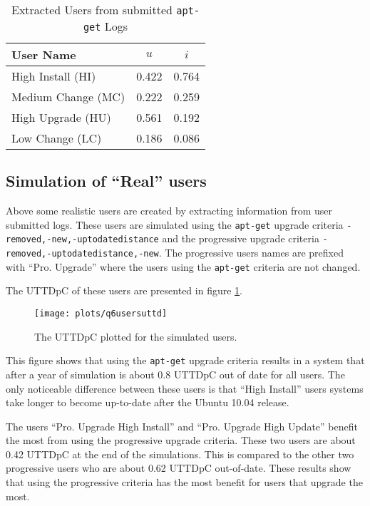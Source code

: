 \begin{table}[h!]
\centering
\begin{tabular}{|l | c | c | }
\hline
User Name 				& 	$u$ 		& $i$ 		\\ \hline
High Install (HI)			& 0.422			& 0.764 	\\
Medium Change (MC)			& 0.222			& 0.259 	\\
High Upgrade (HU)			& 0.561			& 0.192		\\
Low Change 	(LC)			& 0.186			& 0.086 	\\ \hline
\end{tabular}
\caption{Extracted Users from submitted \texttt{apt-get} Logs}
\label{exp.tbluserlogs}
\end{table}

\subsection{Simulation of ``Real'' users}
Above some realistic users are created by extracting information from user submitted logs.
These users are simulated using the \texttt{apt-get} upgrade criteria \texttt{-removed,-new,-uptodatedistance} and the progressive upgrade criteria \texttt{-removed,-uptodatedistance,-new}.
The progressive users names are prefixed  with ``Pro. Upgrade'' where the users using the \texttt{apt-get} criteria are not changed.

The UTTDpC of these users are presented in figure \ref{exp.q6uttdpc}.
\begin{figure}[htp]
\begin{center}
  \texttt{[image: plots/q6usersuttd]}
  \caption{The UTTDpC plotted for the simulated users.}
  \label{exp.q6uttdpc}
\end{center}
\end{figure}
This figure shows that using the \texttt{apt-get} upgrade criteria results in a system that after a year of simulation is about 0.8 UTTDpC out of date for all users. 
The only noticeable difference between these users is that ``High Install'' users systems take longer to become up-to-date after the Ubuntu 10.04 release.

The users ``Pro. Upgrade High Install'' and ``Pro. Upgrade High Update'' benefit the most from using the progressive upgrade criteria.
These two users are about 0.42 UTTDpC at the end of the simulations.
This is compared to the other two progressive users who are about 0.62 UTTDpC out-of-date.
These results show that using the progressive criteria has the most benefit for users that upgrade the most.      


